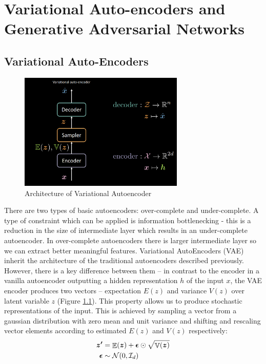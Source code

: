 \chapter{Variational Auto-encoders and Generative Adversarial Networks}

\section{Variational Auto-Encoders}
\begin{figure}[H]
    \centering
    \includegraphics[width=0.7\textwidth]{figs/vae.png}
    \caption{Architecture of Variational Autoencoder}
    \label{fig:vae}
\end{figure}

There are two types of basic autoencoders: over-complete and under-complete. A type of constraint which can be applied is information bottlenecking - this is a reduction in the size of intermediate layer which results in an under-complete autoencoder. In over-complete autoencoders there is larger intermediate layer so we can extract better meaningful features. Variational AutoEncoders (VAE) inherit the architecture of the traditional autoencoders described previously. However, there is a key difference between them -- in contrast to the encoder in a vanilla autoencoder outputting a hidden representation $h$ of the input $x$, the VAE encoder produces two vectors -- expectation $E(z)$ and variance $V(z)$ over latent variable $z$ (Figure \ref{fig:vae}). This property allows us to produce stochastic representations of the input. This is achieved by sampling a vector from a gaussian distribution with zero mean and unit variance and shifting and rescaling vector elements according to estimated $E(z)$ and $V(z)$ respectively:
\begin{align*}
    \vect{z'} &= \mathop{\mathbb{E}}(\vect{z}) + \vect{\epsilon} \odot \sqrt{\mathop{\mathbb{V}}(\vect{z})} \\
    \vect{\epsilon} &\sim \mathcal{N}(0, \mathcal{I}_d)
\end{align*}

